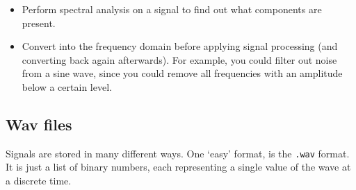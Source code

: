 \begin{itemize}
  \item Perform spectral analysis on a signal to find out what components are 
    present.
  \item Convert into the frequency domain before applying signal processing (and
    converting back again afterwards). For example, you could filter out noise 
    from a sine wave, since you could remove all frequencies with an amplitude
    below a certain level.
\end{itemize}

\subsection{Wav files}

Signals are stored in many different ways. One `easy' format, is the
\texttt{.wav} format. It is just a list of binary numbers, each representing a
single value of the wave at a discrete time.

